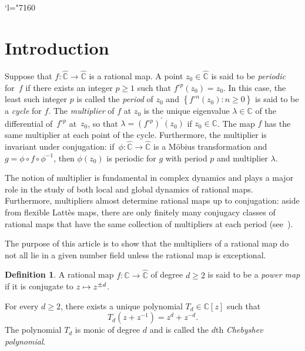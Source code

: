 \documentclass[11pt]{article}
\newcommand{\Changel}{\mathcode`l="7160}
\newcommand\mto{\mathchoice{\longmapsto}{\mapsto}{\mapsto}{\mapsto}}
\theoremstyle{plain}
\theoremstyle{definition}
\newtheorem{definition}[theorem]{Definition}
\theoremstyle{remark}
\begin{document}
\Changel

\section{Introduction}

Suppose that $f \colon \widehat{\mathbb{C}} \to \widehat{\mathbb{C}}$ is a rational map. A point $z_{0} \in \widehat{\mathbb{C}}$ is said to be \emph{periodic} for~$f$ if there exists an integer $p \geq 1$ such that $f^{\circ p}(z_{0}) = z_{0}$. In this case, the least such integer $p$ is called the \emph{period} of $z_{0}$ and $\left\lbrace f^{\circ n}(z_{0}) : n \geq 0 \right\rbrace$ is said to be a \emph{cycle} for $f$. The \emph{multiplier} of $f$ at $z_{0}$ is the unique eigenvalue $\lambda \in \mathbb{C}$ of the differential of~$f^{\circ p}$ at~$z_{0}$, so that $\lambda = \left(f^{\circ p} \right)^{\prime}(z_{0})$ if $z_{0} \in \mathbb{C}$. The map $f$ has the same multiplier at each point of the cycle. Furthermore, the multiplier is invariant under conjugation: if~$\phi \colon \widehat{\mathbb{C}} \to \widehat{\mathbb{C}}$ is a Möbius transformation and $g = \phi \circ f \circ \phi^{-1}$, then $\phi(z_{0})$ is periodic for $g$ with period $p$ and multiplier $\lambda$.

The notion of multiplier is fundamental in complex dynamics and plays a major role in the study of both local and global dynamics of rational maps. Furthermore, multipliers almost determine rational maps up to conjugation: aside from flexible Lattès maps, there are only finitely many conjugacy classes of rational maps that have the same collection of multipliers at each period (see~\cite[Cor.\,2.3]{MM1987}).

The purpose of this article is to show that the multipliers of a rational map do not all lie in a given number field unless the rational map is exceptional.

\begin{definition}
A rational map $f \colon \widehat{\mathbb{C}} \to \widehat{\mathbb{C}}$ of degree $d \geq 2$ is said to be a \emph{power map} if it is conjugate to $z \mto z^{\pm d}$.
\end{definition}

For every $d \geq 2$, there exists a unique polynomial $T_{d} \in \mathbb{C}[z]$ such that
\[
T_{d}\left(z +z^{-1} \right) = z^{d} +z^{-d}.
\]
The polynomial $T_{d}$ is monic of degree $d$ and is called the $d$th \emph{Chebyshev polynomial}.
\end{document}

